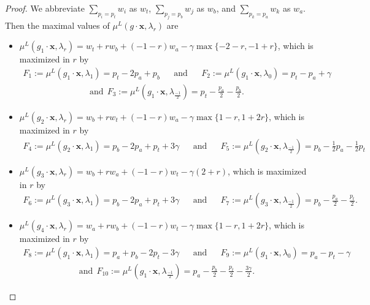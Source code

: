 \documentclass{amsart}
\numberwithin{equation}{section}
\theoremstyle{definition}
\begin{document}
\begin{proof}
We abbreviate $\sum_{p_i = p_t} w_i$ as $w_t$, $\sum_{p_j = p_b} w_j$ as $w_b$, and $\sum_{p_k = p_a} w_k$ as $w_a$. Then the maximal values of $\mu^L( g \cdot \mathbf{x}, \lambda_r)$ are

\begin{itemize}
    \item $\mu^L(g_1 \cdot \mathbf{x}, \lambda_r) = w_t + rw_b +(-1-r)w_a - \gamma \max\{ -2-r, -1+r \}$, which is maximized in $r$ by
     \begin{align*}
        F_1 := \mu^L(g_1 \cdot \mathbf{x}, \lambda_1) = p_t -2p_a +p_b
        && \text{and} &&
        F_2 := \mu^L(g_1 \cdot \mathbf{x}, \lambda_0) = p_t - p_a + \gamma \end{align*}
        \begin{align*} \text{and} \ \ F_3 := \mu^L(g_1 \cdot \mathbf{x}, \lambda_{\frac{-1}{2}}) = p_t - \frac{p_a}{2} - \frac{p_b}{2}.   \end{align*}
    
    
    \item $\mu^L(g_2 \cdot \mathbf{x}, \lambda_r) = w_b + rw_t +(-1-r) w_a - \gamma \max\{1-r, 1+2r \}$, which is maximized in $r$ by
      \begin{align*}
        F_4 := \mu^L(g_2 \cdot \mathbf{x},  \lambda_1) = p_b -2 p_a + p_t + 3 \gamma 
        && \text{and} &&
        F_5 := \mu^L(g_2 \cdot \mathbf{x}, \lambda_{\frac{-1}{2}}) = p_b - \frac{1}{2}p_a - \frac{1}{2}p_t
    \end{align*}
    
    \item $\mu^L(g_3 \cdot \mathbf{x}, \lambda_r) = w_b + rw_a + (-1-r)w_t - \gamma (2+r)$, which is maximized in $r$ by
     \begin{align*}
        F_6 := \mu^L(g_3 \cdot \mathbf{x}, \lambda_1) = p_b -2 p_a + p_t + 3 \gamma
        && \text{and} &&
        F_7 := \mu^L(g_3 \cdot \mathbf{x}, \lambda_{\frac{-1}{2}}) = p_b - \frac{p_a}{2} - \frac{p_t}{2}.
    \end{align*}
    
    \item $\mu^L(g_4 \cdot \mathbf{x}, \lambda_r) = w_a + r w_b + (-1-r) w_t - \gamma \max \{1-r, 1+2r\}$, which is maximized in $r$ by
    \begin{align*}
        F_8 := \mu^L(g_1 \cdot \mathbf{x}, \lambda_1) = p_a + p_b - 2 p_t - 3 \gamma
        && \text{and} &&
        F_9 := \mu^L(g_1 \cdot \mathbf{x},  \lambda_0) = p_a - p_t - \gamma
        \end{align*}
        \begin{align*} \text{and} \ \
        F_{10} := \mu^L(g_1 \cdot \mathbf{x}, \lambda_{\frac{-1}{2}}) = p_a - \frac{p_b}{2} - \frac{p_t}{2} - \frac{3\gamma}{2}.
    \end{align*}
    

\end{itemize}
\end{proof}
\end{document}
